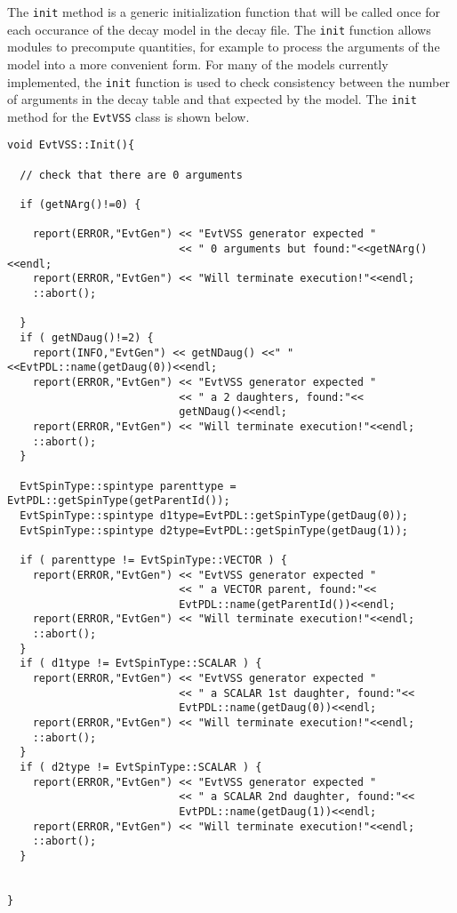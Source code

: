 The {\tt init} method is a generic
initialization function that will be called once for each occurance
of the decay model in the decay file. 
The {\tt init} function allows modules to precompute quantities, for example
to process the arguments of the
model into a more convenient form.  For many of the models
currently implemented, the {\tt init} function is used
to check consistency between the number of arguments
in the decay table and that expected by the model. The 
{\tt init} method for the {\tt EvtVSS} class
is shown below.

\begin{footnotesize}
\begin{verbatim}
void EvtVSS::Init(){

  // check that there are 0 arguments

  if (getNArg()!=0) {

    report(ERROR,"EvtGen") << "EvtVSS generator expected "
                           << " 0 arguments but found:"<<getNArg()<<endl;
    report(ERROR,"EvtGen") << "Will terminate execution!"<<endl;
    ::abort();

  }
  if ( getNDaug()!=2) {
    report(INFO,"EvtGen") << getNDaug() <<" "<<EvtPDL::name(getDaug(0))<<endl;
    report(ERROR,"EvtGen") << "EvtVSS generator expected "
                           << " a 2 daughters, found:"<<
                           getNDaug()<<endl;
    report(ERROR,"EvtGen") << "Will terminate execution!"<<endl;
    ::abort();
  }
    
  EvtSpinType::spintype parenttype = EvtPDL::getSpinType(getParentId());
  EvtSpinType::spintype d1type=EvtPDL::getSpinType(getDaug(0));
  EvtSpinType::spintype d2type=EvtPDL::getSpinType(getDaug(1));

  if ( parenttype != EvtSpinType::VECTOR ) {
    report(ERROR,"EvtGen") << "EvtVSS generator expected "
                           << " a VECTOR parent, found:"<<
                           EvtPDL::name(getParentId())<<endl;
    report(ERROR,"EvtGen") << "Will terminate execution!"<<endl;
    ::abort();
  }
  if ( d1type != EvtSpinType::SCALAR ) {
    report(ERROR,"EvtGen") << "EvtVSS generator expected "
                           << " a SCALAR 1st daughter, found:"<<
                           EvtPDL::name(getDaug(0))<<endl;
    report(ERROR,"EvtGen") << "Will terminate execution!"<<endl;
    ::abort();
  }
  if ( d2type != EvtSpinType::SCALAR ) {
    report(ERROR,"EvtGen") << "EvtVSS generator expected "
                           << " a SCALAR 2nd daughter, found:"<<
                           EvtPDL::name(getDaug(1))<<endl;
    report(ERROR,"EvtGen") << "Will terminate execution!"<<endl;
    ::abort();
  }


}
\end{verbatim}
\end{footnotesize}

